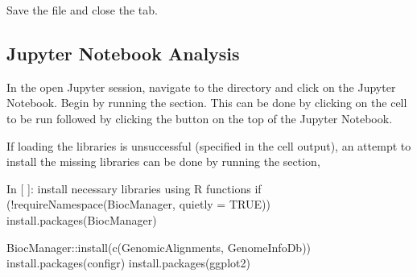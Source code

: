 \documentclass[letterpaper,10pt,english]{sphinxhowto}
\begin{document}
\sphinxAtStartPar
Save the file and close the tab.


\subsection{Jupyter Notebook Analysis}
\label{\detokenize{index:jupyter-notebook-analysis}}
\sphinxAtStartPar
In the open Jupyter session, navigate to the  directory and click on the  Jupyter Notebook. Begin by running the  section. This can be done by clicking on the cell to be run followed by clicking the  button on the top of the Jupyter Notebook.

\begin{sphinxVerbatim}[commandchars=\\\{\}]
 \PYG{p}{[} \PYG{p}{]}  

\end{sphinxVerbatim}

\sphinxAtStartPar
If loading the libraries is unsuccessful (specified in the cell output), an attempt to install the missing libraries can be done by running the  section,

\begin{sphinxVerbatim}[commandchars=\\\{\}]
In [ ]:  \PYGZsh{} install necessary libraries using R functions
         if (!requireNamespace(\PYGZdq{}BiocManager\PYGZdq{}, quietly = TRUE))
             install.packages(\PYGZdq{}BiocManager\PYGZdq{})

         BiocManager::install(c(\PYGZdq{}GenomicAlignments\PYGZdq{}, \PYGZdq{}GenomeInfoDb\PYGZdq{}))
         install.packages(\PYGZdq{}configr\PYGZdq{})
         install.packages(\PYGZdq{}ggplot2\PYGZdq{})
\end{sphinxVerbatim}
\end{document}
